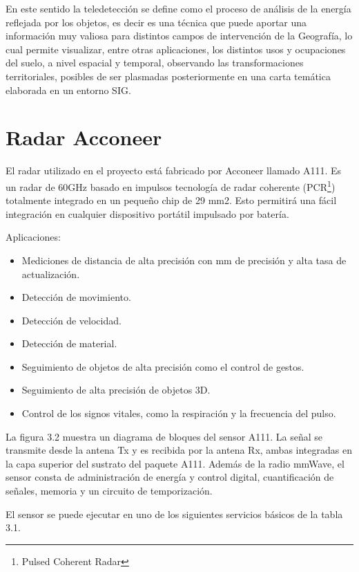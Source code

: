 En este sentido la teledetección se define como el proceso de análisis de la energía reflejada por los objetos, es decir es una técnica que puede aportar una información muy valiosa para distintos campos de intervención de la Geografía, lo cual permite visualizar, entre otras aplicaciones, los distintos usos y ocupaciones del suelo, a nivel espacial y temporal, observando las transformaciones territoriales, posibles de ser plasmadas posteriormente en una carta temática elaborada en un entorno SIG. 

\section{Radar Acconeer}

El radar utilizado en el proyecto está fabricado por Acconeer llamado A111. Es un radar de 60GHz basado en impulsos tecnología de radar coherente (PCR\footnote{Pulsed
Coherent Radar}) totalmente integrado en un pequeño chip de 29 mm2.
Esto permitirá una fácil integración en cualquier dispositivo portátil impulsado por batería.


Aplicaciones:
\begin{itemize}
	\item Mediciones de distancia de alta precisión con mm de precisión y alta tasa de actualización.
	\item Detección de movimiento.
	\item Detección de velocidad.
	\item Detección de material.
	\item Seguimiento de objetos de alta precisión como el control de gestos.
	\item Seguimiento de alta precisión de objetos 3D.
	\item Control de los signos vitales, como la respiración y la frecuencia del pulso.
\end{itemize}


La figura 3.2 muestra un diagrama de bloques del sensor A111. La señal se transmite desde la antena Tx y es recibida por la antena Rx, ambas integradas en la capa superior del sustrato del paquete A111. Además de la radio mmWave, el sensor consta de administración de energía y control digital, cuantificación de señales, memoria y un circuito de temporización.

El sensor se puede ejecutar en uno de los siguientes servicios básicos de la tabla 3.1.

